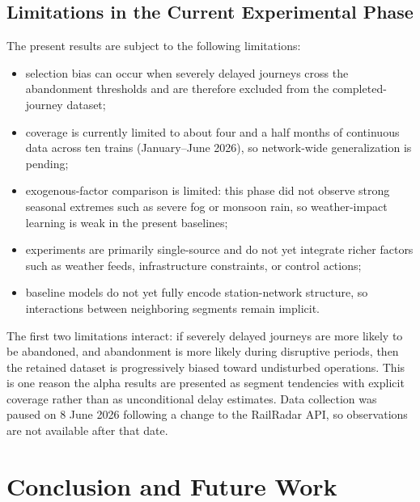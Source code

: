 \documentclass[conference]{IEEEtran}
\begin{document}
\subsection{Limitations in the Current Experimental Phase}
The present results are subject to the following limitations:
\begin{itemize}
    \item selection bias can occur when severely delayed journeys cross the abandonment thresholds and are therefore excluded from the completed-journey dataset;
    \item coverage is currently limited to about four and a half months of continuous data across ten trains (January--June 2026), so network-wide generalization is pending;
    \item exogenous-factor comparison is limited: this phase did not observe strong seasonal extremes such as severe fog or monsoon rain, so weather-impact learning is weak in the present baselines;
    \item experiments are primarily single-source and do not yet integrate richer factors such as weather feeds, infrastructure constraints, or control actions;
    \item baseline models do not yet fully encode station-network structure, so interactions between neighboring segments remain implicit.
\end{itemize}
The first two limitations interact: if severely delayed journeys are more likely to be abandoned, and abandonment is more likely during disruptive periods, then the retained dataset is progressively biased toward undisturbed operations. This is one reason the alpha results are presented as segment tendencies with explicit coverage rather than as unconditional delay estimates. Data collection was paused on 8 June 2026 following a change to the RailRadar API, so observations are not available after that date.

\section{Conclusion and Future Work}
\label{sec:conclusion}
\end{document}
